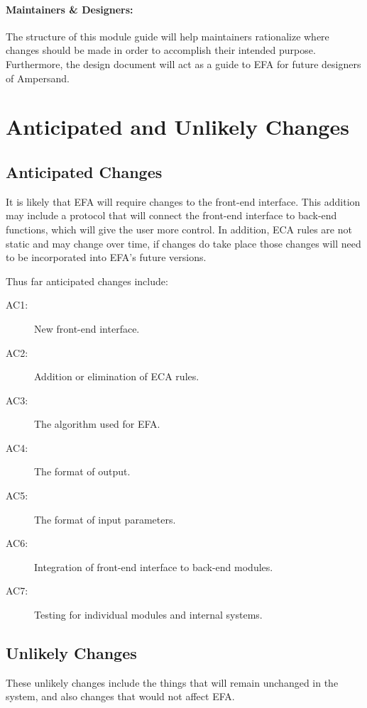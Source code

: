 \documentclass[12pt, svgnames]{article}
\let\Oldsubsection\subsection
\renewcommand{\subsection}{\FloatBarrier\Oldsubsection}
\begin{document}
\paragraph{Maintainers \& Designers:} The structure of this module guide will 
help maintainers rationalize where changes should be made in order to 
accomplish their intended purpose. Furthermore, the design document will act as 
a guide to EFA for future designers of Ampersand.

\section{Anticipated and Unlikely Changes}
\subsection{Anticipated Changes}
It is likely that EFA will require changes to the front-end interface. This 
addition may include a protocol that will connect the front-end interface to 
back-end functions, which will give the user more control. In addition, ECA 
rules are not static and may change over time, if changes do take place those 
changes will need to be incorporated into EFA's future versions. 

Thus far anticipated changes include:

\begin{description}
    \item[AC1:] New front-end interface.
    \item[AC2:] Addition or elimination of ECA rules.
    \item[AC3:] The algorithm used for EFA.
    \item[AC4:] The format of output.
    \item[AC5:] The format of input parameters.
    \item[AC6:] Integration of front-end interface to back-end modules.
    \item[AC7:] Testing for individual modules and internal systems.
    
\end{description}

\subsection{Unlikely Changes} 

These unlikely changes include the things that will remain unchanged in the 
system, and also changes that would not affect EFA. 
\end{document}
